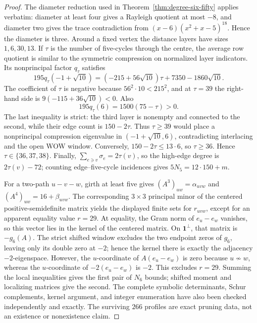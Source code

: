 \documentclass[a4paper,10pt,reqno]{amsart}
\theoremstyle{plain}
\theoremstyle{definition}
\theoremstyle{remark}
\newcommand{\one}{\mathbf 1}
\begin{document}
\begin{proof}
The diameter reduction used in Theorem~\ref{thm:degree-six-fifty} applies
verbatim: diameter at least four gives a Rayleigh quotient at most \(-8\), and
diameter two gives the trace contradiction from
\((x-6)(x^2+x-5)^{18}\).  Hence the diameter is three.  Around a fixed vertex
the distance layers have sizes \(1,6,30,13\).  If \(\tau\) is the number of
five-cycles through the centre, the average row quotient is similar to the
symmetric compression on normalized layer indicators.  Its nonprincipal factor
\(q_\tau\) satisfies
\[
 195q_\tau(-1+\sqrt{10})
 =(-215+56\sqrt{10})\tau+7350-1860\sqrt{10}.
\]
The coefficient of \(\tau\) is negative because
\(56^2\cdot10<215^2\), and at \(\tau=39\) the right-hand side is
\(9(-115+36\sqrt{10})<0\).  Also
\[
 195q_\tau(6)=1500(75-\tau)>0.
\]
The last inequality is strict: the third layer is nonempty and connected to the
second, while their edge count is \(150-2\tau\).  Thus \(\tau\ge39\)
would place a nonprincipal compression eigenvalue in
\((-1+\sqrt{10},6)\), contradicting interlacing and the open WOW window.
Conversely, \(150-2\tau\le13\cdot6\), so \(\tau\ge36\).  Hence
\(\tau\in\{36,37,38\}\).  Finally,
\(\sum_{e\ni v}\sigma_e=2\tau(v)\), so the high-edge degree is
\(2\tau(v)-72\); counting edge--five-cycle incidences gives
\(5N_5=12\cdot150+m\).

For a two-path \(u-v-w\), girth at least five gives
\((A^3)_{uw}=\alpha_{uvw}\) and
\((A^4)_{uw}=16+\beta_{uvw}\).  The corresponding \(3\times3\) principal
minor of the centered positive-semidefinite matrix yields the displayed finite
sets for \(r_{uvw}\), except for an apparent equality value \(r=29\).
At equality, the Gram norm of \(e_u-e_w\) vanishes, so this vector lies in
the kernel of the centered matrix.  On \(\one^\perp\), that matrix is
\(-g_6(A)\).  The strict shifted window excludes the two endpoint zeros of
\(g_6\), leaving only its double zero at \(-2\); hence the kernel there is
exactly the adjacency \(-2\)-eigenspace.  However, the \(u\)-coordinate of
\(A(e_u-e_w)\) is zero because \(u\not\sim w\), whereas the
\(u\)-coordinate of \(-2(e_u-e_w)\) is \(-2\).  This excludes
\(r=29\).  Summing the local inequalities gives the first pair of
\(N_6\) bounds; shifted moment and localizing matrices give the second.
The complete symbolic determinants, Schur complements, kernel argument, and
integer enumeration have also been checked independently and exactly.  The
surviving \(266\) profiles are exact pruning data, not an existence or
nonexistence claim.
\end{proof}
\end{document}
